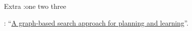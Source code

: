 \begin{rSection}{}
  \begin{experienceItem}
    {\hphantom{}}{}{Extra :}{one two three}{}
  \end{experienceItem}


  \begin{experienceItem}
    {}{}{: ``\href{https://repository.tudelft.nl/islandora/object/uuid\%3Af988aaf6-c2a7-4782-b5de-8ca6187d03ef?collection=education}{A graph-based search approach for planning and learning}''.} {}
  \end{experienceItem}
\end{rSection}

